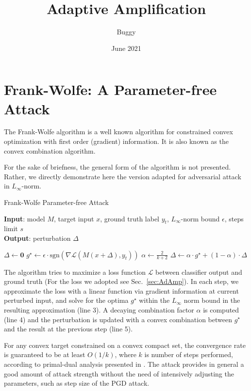 \documentclass{article}
\title{Adaptive Amplification}
\author{Buggy}
\date{June 2021}
\begin{document}
\maketitle

\section{Frank-Wolfe: A Parameter-free Attack}
The Frank-Wolfe algorithm \cite{frank1956algorithm} is a well known algorithm for constrained convex optimization with first order (gradient) information. It is also known as the convex combination algorithm.

For the sake of briefness, the general form of the algorithm is not presented. Rather, we directly demonstrate here the version adapted for adversarial attack in $L_\infty$-norm.

\begin{algorithm}[h]
\caption{Frank-Wolfe Parameter-free Attack}
\label{alg:FWPFA}
\hspace*{\algorithmicindent} \textbf{Input}: model $M$, target input $x$, ground truth label $y_t$, $L_\infty$-norm bound $\epsilon$, steps limit $s$ \\
\hspace*{\algorithmicindent} \textbf{Output}: perturbation $\Delta$
\begin{algorithmic}[1]
\State $\Delta \leftarrow \mathbf{0}$ 
    \State $g^\star \leftarrow \epsilon \cdot \mathrm{sgn}\left(\nabla \mathcal{L}(M(x + \Delta), y_t)\right)$
    \State $\alpha \leftarrow \frac{2}{k + 2}$
    \State $\Delta \leftarrow \alpha \cdot g^\star + (1 - \alpha)\cdot\Delta$
\EndFor
\end{algorithmic}
\end{algorithm}

The algorithm tries to maximize a loss function $\mathcal{L}$ between classifier output and ground truth (For the loss we adopted see Sec.\ \ref{sec:AdAmp}). In each step, we approximate the loss with a linear function via gradient information at current perturbed input, and solve for the optima $g^\star$ within the $L_\infty$ norm bound in the resulting approximation (line 3). A decaying combination factor $\alpha$ is computed (line 4) and the perturbation is updated with a convex combination between $g^\star$ and the result at the previous step (line 5).

For any convex target constrained on a convex compact set, the convergence rate is guaranteed to be at least $O(1/k)$, where $k$ is number of steps performed, according to primal-dual analysis presented in \cite{jaggi2013revisiting}. The attack provides in general a good amount of attack strength without the need of intensively adjusting the parameters, such as step size of the PGD attack.
\end{document}

